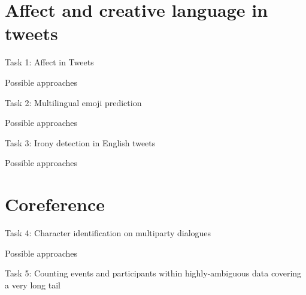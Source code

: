 \documentclass[10pt, compress]{beamer}
\begin{document}
\section{Affect and creative language in tweets}

\begin{frame}{Task 1: Affect in Tweets}


\end{frame}

\begin{frame}{Possible approaches}


\end{frame}

\begin{frame}{Task 2: Multilingual emoji prediction}


\end{frame}

\begin{frame}{Possible approaches}


\end{frame}

\begin{frame}{Task 3: Irony detection in English tweets}


\end{frame}

\begin{frame}{Possible approaches}

\section{Coreference}

\end{frame}

\begin{frame}{Task 4: Character identification on multiparty dialogues}


\end{frame}

\begin{frame}{Possible approaches}


\end{frame}

\begin{frame}{Task 5: Counting events and participants within highly-ambiguous data covering a very long tail}


\end{frame}
\end{document}
